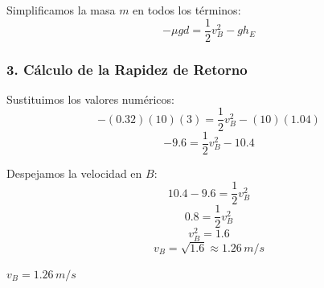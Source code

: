 \documentclass[12pt, a4paper]{article}
\begin{document}
Simplificamos la masa $m$ en todos los términos:
$$ -\mu g d = \frac{1}{2} v_B^2 - g h_E $$

\subsubsection*{3. Cálculo de la Rapidez de Retorno}
Sustituimos los valores numéricos:
$$ -(0.32)(10)(3) = \frac{1}{2} v_B^2 - (10)(1.04) $$
$$ -9.6 = \frac{1}{2} v_B^2 - 10.4 $$

Despejamos la velocidad en $B$:
$$ 10.4 - 9.6 = \frac{1}{2} v_B^2 $$
$$ 0.8 = \frac{1}{2} v_B^2 $$
$$ v_B^2 = 1.6 $$
$$ v_B = \sqrt{1.6} \approx 1.26 \, \si{m/s} $$

\begin{tcolorbox}[colback=green!5!white, colframe=green!50!black, title=Respuesta Final]
\centering $v_B = 1.26 \, \si{m/s}$
\end{tcolorbox}
\end{document}
